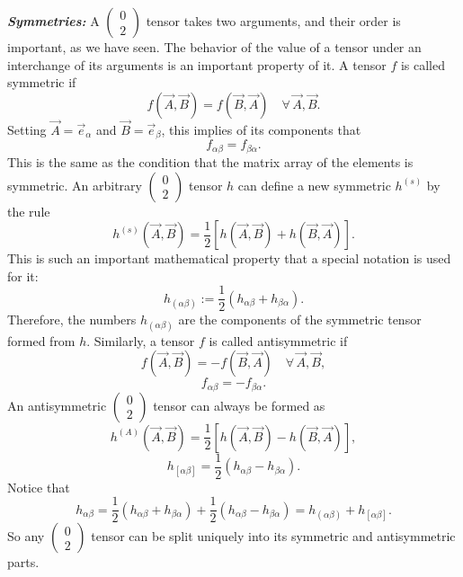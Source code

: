 \documentclass[12pt]{book}
\begin{document}
    \textit{\textbf{Symmetries:}} A \(\left(\begin{array}{c} 0 \\ 2 \end{array}\right)\) tensor takes two arguments, and their order is important, as we have seen. The behavior of the value of a tensor under an interchange of its arguments is an important property of it. A tensor \(f\) is called symmetric if
    \[
    f(\vec{A},\vec{B}) = f(\vec{B},\vec{A}) \quad \forall \, \vec{A}, \vec{B}. \tag{3.27}
    \]
    Setting \(\vec{A} = \vec{e}_\alpha\) and \(\vec{B} = \vec{e}_\beta\), this implies of its components that
    \[
    f_{\alpha\beta} = f_{\beta\alpha}. \tag{3.28}
    \]
    This is the same as the condition that the matrix array of the elements is symmetric. An arbitrary \(\left(\begin{array}{c} 0 \\ 2 \end{array}\right)\) tensor \(h\) can define a new symmetric \(h^{(s)}\) by the rule
    \[
    h^{(s)}(\vec{A},\vec{B}) = \frac{1}{2} \left[ h(\vec{A},\vec{B}) + h(\vec{B},\vec{A}) \right]. \tag{3.29}
    \]
    This is such an important mathematical property that a special notation is used for it:
    \[
    h_{(\alpha\beta)} := \frac{1}{2} \left( h_{\alpha\beta} + h_{\beta\alpha} \right). \tag{3.31}
    \]
    Therefore, the numbers \(h_{(\alpha\beta)}\) are the components of the symmetric tensor formed from \(h\).
    Similarly, a tensor \(f\) is called antisymmetric if
    \[
    f(\vec{A},\vec{B}) = -f(\vec{B},\vec{A}) \quad \forall \, \vec{A}, \vec{B}, \tag{3.32}
    \]
    \[
    f_{\alpha\beta} = -f_{\beta\alpha}. \tag{3.33}
    \]
    An antisymmetric \(\left(\begin{array}{c} 0 \\ 2 \end{array}\right)\) tensor can always be formed as
    \[
    h^{(A)}(\vec{A},\vec{B}) = \frac{1}{2} \left[ h(\vec{A},\vec{B}) - h(\vec{B},\vec{A}) \right],
    \]
    \[
    h_{[\alpha\beta]} = \frac{1}{2} \left( h_{\alpha\beta} - h_{\beta\alpha} \right). \tag{3.34}
    \]
    Notice that
    \[
    h_{\alpha\beta} = \frac{1}{2} \left( h_{\alpha\beta} + h_{\beta\alpha} \right) + \frac{1}{2} \left( h_{\alpha\beta} - h_{\beta\alpha} \right)
    = h_{(\alpha\beta)} + h_{[\alpha\beta]}. \tag{3.35}
    \]
    So any \(\left(\begin{array}{c} 0 \\ 2 \end{array}\right)\) tensor can be split uniquely into its symmetric and antisymmetric parts.
    
\end{document}
